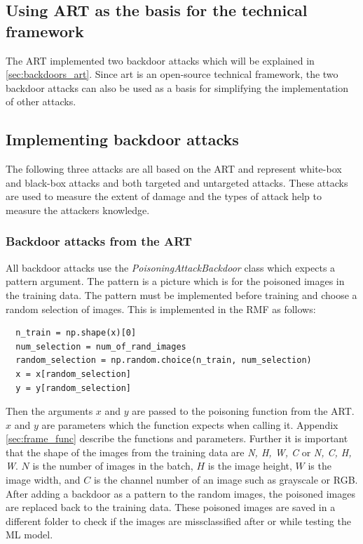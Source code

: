 \subsection{Using ART as the basis for the technical framework}

The ART implemented two backdoor attacks which will be explained in \ref{sec:backdoors_art}. Since art is an open-source technical framework, the two backdoor attacks can also be used as a basis for simplifying the implementation of other attacks.

\subsection{Implementing backdoor attacks}

The following three attacks are all based on the ART and represent white-box and black-box attacks and both targeted and untargeted attacks. These attacks are used to measure the extent of damage and the types of attack help to measure the attackers knowledge.

\subsubsection*{Backdoor attacks from the ART}
\label{sec:backdoors_art}

All backdoor attacks use the \textit{PoisoningAttackBackdoor} class which expects a pattern argument. The pattern is a picture which is for the poisoned images in the training data. The pattern must be implemented before training and choose a random selection of images. This is implemented in the RMF as follows:

\begin{lstlisting}
  n_train = np.shape(x)[0]
  num_selection = num_of_rand_images
  random_selection = np.random.choice(n_train, num_selection)
  x = x[random_selection]
  y = y[random_selection]
\end{lstlisting}

Then the arguments $x$ and $y$ are passed to the poisoning function from the ART. $x$ and $y$ are parameters which the function expects when calling it. Appendix \ref{sec:frame_func} describe the functions and parameters. Further it is important that the shape of the images from the training data are \textit{N, H, W, C} or \textit{N, C, H, W}. $N$ is the number of images in the batch, $H$ is the image height, $W$ is the image width, and $C$ is the channel number of an image such as grayscale or RGB. After adding a backdoor as a pattern to the random images, the poisoned images are replaced back to the training data. These poisoned images are saved in a different folder to check if the images are missclassified after or while testing the ML model.\\

